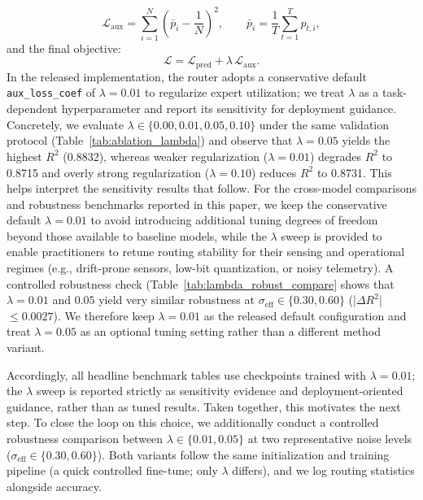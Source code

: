 \documentclass[review,3p,times]{elsarticle}
\begin{document}
\begin{equation}
\mathcal{L}_{\text{aux}} = \sum_{i=1}^{N}\left(\bar{p}_i - \frac{1}{N}\right)^2,\qquad
\bar{p}_i=\frac{1}{T}\sum_{t=1}^{T}p_{t,i},
\end{equation}
and the final objective:
\begin{equation}
\mathcal{L} = \mathcal{L}_{\text{pred}} + \lambda\,\mathcal{L}_{\text{aux}}.
\end{equation}
In the released implementation, the router adopts a conservative default \texttt{aux\_loss\_coef} of $\lambda=0.01$ to regularize expert utilization; we treat $\lambda$ as a task-dependent hyperparameter and report its sensitivity for deployment guidance. Concretely, we evaluate $\lambda\in\{0.00,0.01,0.05,0.10\}$ under the same validation protocol (Table~\ref{tab:ablation_lambda}) and observe that $\lambda=0.05$ yields the highest $R^{2}$ (0.8832), whereas weaker regularization ($\lambda=0.01$) degrades $R^{2}$ to 0.8715 and overly strong regularization ($\lambda=0.10$) reduces $R^{2}$ to 0.8731. This helps interpret the sensitivity results that follow. For the cross-model comparisons and robustness benchmarks reported in this paper, we keep the conservative default $\lambda=0.01$ to avoid introducing additional tuning degrees of freedom beyond those available to baseline models, while the $\lambda$ sweep is provided to enable practitioners to retune routing stability for their sensing and operational regimes (e.g., drift-prone sensors, low-bit quantization, or noisy telemetry). A controlled robustness check (Table~\ref{tab:lambda_robust_compare} shows that $\lambda=0.01$ and $0.05$ yield very similar robustness at $\sigma_{\mathrm{eff}}\in\{0.30,0.60\}$ (|$\Delta R^2$| $\leq 0.0027$). We therefore keep $\lambda=0.01$ as the released default configuration and treat $\lambda=0.05$ as an optional tuning setting rather than a different method variant.

Accordingly, all headline benchmark tables use checkpoints trained with $\lambda=0.01$; the $\lambda$ sweep is reported strictly as sensitivity evidence and deployment-oriented guidance, rather than as tuned results. Taken together, this motivates the next step. To close the loop on this choice, we additionally conduct a controlled robustness comparison between $\lambda\in\{0.01,0.05\}$ at two representative noise levels ($\sigma_{\mathrm{eff}}\in\{0.30,0.60\}$). Both variants follow the same initialization and training pipeline (a quick controlled fine-tune; only $\lambda$ differs), and we log routing statistics alongside accuracy.
\end{document}
